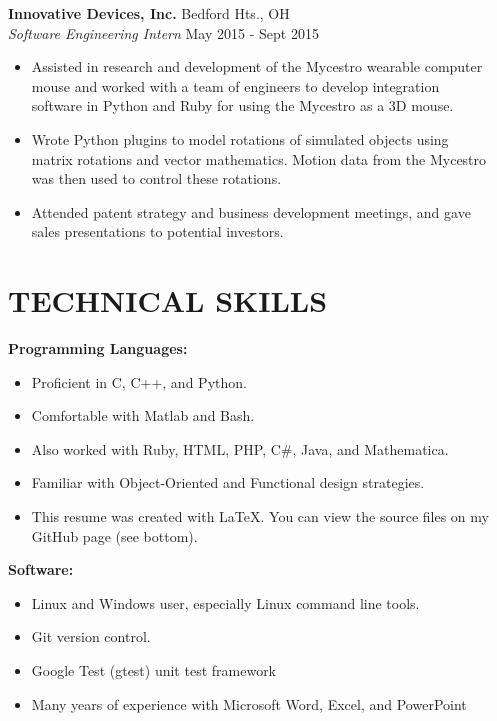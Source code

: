 \documentclass[margin,11pt]{res}
\begin{document}
\begin{resume}
\vspace{-10pt}
\textbf{Innovative Devices, Inc.} \hfill Bedford Hts., OH\\
\textsl{Software Engineering Intern} \hfill May 2015 - Sept 2015
\begin{itemize}
	\itemsep -2pt
    \item Assisted in research and development of the Mycestro wearable computer\\
          mouse and worked with a team of engineers to develop integration\\
          software in Python and Ruby for using the Mycestro as a 3D mouse.
    \item Wrote Python plugins to model rotations of simulated objects using\\
          matrix rotations and vector mathematics. Motion data from the Mycestro\\
          was then used to control these rotations.
    \item Attended patent strategy and business development meetings, and gave\\
          sales presentations to potential investors.
\end{itemize}

\vspace{-10pt}
\section{TECHNICAL SKILLS}
\textbf{Programming Languages:}\\
\vspace{-10pt}
\begin{itemize}
	\itemsep -2pt
    \item Proficient in C, C++, and Python.
    \item Comfortable with Matlab and Bash.
    \item Also worked with Ruby, HTML, PHP, C\#, Java, and Mathematica.
    \item Familiar with Object-Oriented and Functional design strategies.
    \item This resume was created with LaTeX.
          You can view the source files on my GitHub page (see bottom).
\end{itemize}

\vspace{-10pt}
\textbf{Software:}
\begin{itemize}
	\itemsep -2pt
    \item Linux and Windows user, especially Linux command line tools.
    \item Git version control.
    \item Google Test (gtest) unit test framework
    \item Many years of experience with Microsoft Word, Excel, and PowerPoint
\end{itemize}


\end{resume}
\end{document}
